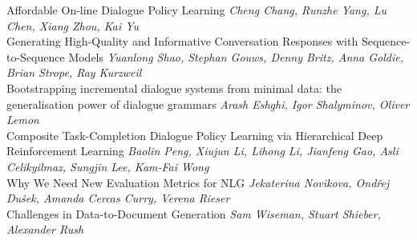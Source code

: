 \documentclass{book}
\begin{document}
    \noindent	Affordable On-line Dialogue Policy Learning \newline 
    {\itshape Cheng Chang, Runzhe Yang, Lu Chen, Xiang Zhou, Kai Yu} \\
    
    \noindent	Generating High-Quality and Informative Conversation Responses with Sequence-to-Sequence Models \newline 
    {\itshape Yuanlong Shao, Stephan Gouws, Denny Britz, Anna Goldie, Brian Strope, Ray Kurzweil} \\
    
    \noindent	Bootstrapping incremental dialogue systems from minimal data: the generalisation power of dialogue grammars \newline 
    {\itshape Arash Eshghi, Igor Shalyminov, Oliver Lemon} \\
    
    \noindent	Composite Task-Completion Dialogue Policy Learning via Hierarchical Deep Reinforcement Learning \newline 
    {\itshape Baolin Peng, Xiujun Li, Lihong Li, Jianfeng Gao, Asli Celikyilmaz, Sungjin Lee, Kam-Fai Wong} \\
    
    \noindent	Why We Need New Evaluation Metrics for NLG \newline 
    {\itshape Jekaterina Novikova, Ondřej Dušek, Amanda Cercas Curry, Verena Rieser} \\
    
    \noindent	Challenges in Data-to-Document Generation \newline 
    {\itshape Sam Wiseman, Stuart Shieber, Alexander Rush} \\
    
\end{document}
